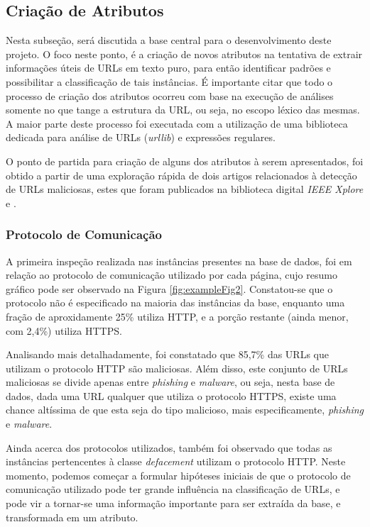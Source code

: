 \documentclass[a4paper, 12pt]{article}
\begin{document}
\subsection{Criação de Atributos}

Nesta subseção, será discutida a base central para o desenvolvimento deste projeto. O foco neste ponto, é a criação de novos atributos na tentativa de extrair informações úteis de URLs em texto puro, para então identificar padrões e possibilitar a classificação de tais instâncias. É importante citar que todo o processo de criação dos atributos ocorreu com base na execução de análises somente no que tange a estrutura da URL, ou seja, no escopo léxico das mesmas. A maior parte deste processo foi executada com a utilização de uma biblioteca dedicada para análise de URLs (\emph{urllib}) e expressões regulares.

O ponto de partida para criação de alguns dos atributos à serem apresentados, foi obtido a partir de uma exploração rápida de dois artigos relacionados à detecção de URLs maliciosas, estes que foram publicados na biblioteca digital \emph{IEEE Xplore} \cite{10019269} e \cite{9950508}. 

\subsubsection{Protocolo de Comunicação}

A primeira inspeção realizada nas instâncias presentes na base de dados, foi em relação ao protocolo de comunicação utilizado por cada página, cujo resumo gráfico pode ser observado na Figura \ref{fig:exampleFig2}. Constatou-se que o protocolo não é especificado na maioria das instâncias da base, enquanto uma fração de aproxidamente 25\% utiliza HTTP, e a porção restante (ainda menor, com 2,4\%) utiliza HTTPS.

Analisando mais detalhadamente, foi constatado que 85,7\% das URLs que utilizam o protocolo HTTP são maliciosas. Além disso, este conjunto de URLs maliciosas se divide apenas entre \emph{phishing} e \emph{malware}, ou seja, nesta base de dados, dada uma URL qualquer que utiliza o protocolo HTTPS, existe uma chance altíssima de que esta seja do tipo malicioso, mais especificamente, \emph{phishing} e \emph{malware}.

Ainda acerca dos protocolos utilizados, também foi observado que todas as instâncias pertencentes à classe \emph{defacement} utilizam o protocolo HTTP. Neste momento, podemos começar a formular hipóteses iniciais de que o protocolo de comunicação utilizado pode ter grande influência na classificação de URLs, e pode vir a tornar-se uma informação importante para ser extraída da base, e transformada em um atributo. 
\end{document}
